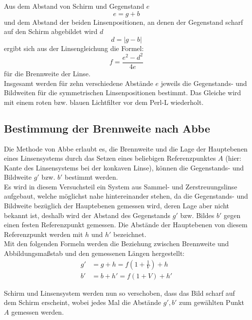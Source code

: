 Aus dem Abstand von Schirm und Gegenstand $e$
%
\begin{equation}
  e = g + b
\end{equation} 
%
und dem Abstand der beiden Linsenpositionen, an denen der Gegenstand
scharf auf den Schirm abgebildet wird $d$ 
%
\begin{equation}
  d = |g - b|
\end{equation}
%
ergibt sich aus der Linsengleichung die Formel:
%
\begin{equation} 
f = \frac{e^2 - d^2}{4e}
\label{eq:Theorie_Bessel}
\end{equation}
%
für die Brennweite der Linse.\\
Insgesamt werden für zehn verschiedene
Abstände $e$ jeweils die Gegenstands- und Bildweiten für die
symmetrischen Linsenpositionen bestimmt.
Das Gleiche wird mit einem roten bzw. blauen Lichtfilter vor dem Perl-L wiederholt.

\subsection{Bestimmung der Brennweite nach Abbe}

Die Methode von Abbe erlaubt es, die Brennweite und die Lage der
Hauptebenen eines Linsensystems durch das Setzen eines beliebigen Referenzpunktes $A$ (hier: Kante des Linsensystems bei der konkaven Linse), können die Gegenstands- und Bildweite $g'$ bzw. $b'$ bestimmt werden.\\
Es wird in diesem Versuchsteil ein System aus Sammel- und Zerstreuungslinse
aufgebaut, welche möglichst nahe hintereinander stehen, da die Gegenstands- und Bildweite bezüglich der Hauptebenen gemessen wird, deren Lage aber nicht bekannt ist, deshalb wird der Abstand des Gegenstands $g'$
bzw. Bildes $b'$ gegen einen festen Referenzpunkt gemessen. Die Abstände der Hauptebenen von diesem Referenzpunkt werden mit $h$ und $h'$
bezeichnet.\\
Mit den folgenden Formeln werden die Beziehung zwischen
Brennweite und Abbildungsmaßstab und den gemessenen Längen hergestellt:
%
\begin{align}
\label{eq:Theorie_g'}
  g' &= g + h  = f \left(1 + \frac{1}{V}\right) + h\\
  b' &= b + h' = f (1 + V) + h'
\label{eq:Theorie_b'}
\end{align}

Schirm und Linsensystem werden nun so verschoben, dass das Bild
scharf auf dem Schirm erscheint, wobei jedes Mal die Abstände $g', b'$ zum gewählten Punkt $A$ gemessen werden.
